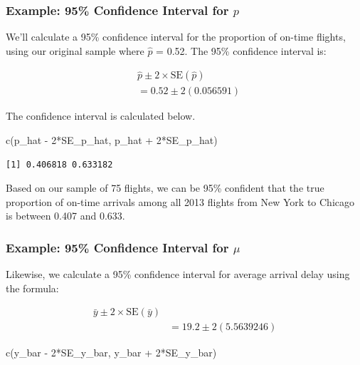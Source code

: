 \documentclass[
  letterpaper,
  DIV=11,
  numbers=noendperiod]{scrreprt}
\newenvironment{Shaded}{\begin{snugshade}}{\end{snugshade}}
\newcommand{\DecValTok}[1]{\textcolor[rgb]{0.68,0.00,0.00}{#1}}
\newcommand{\FunctionTok}[1]{\textcolor[rgb]{0.28,0.35,0.67}{#1}}
\newcommand{\NormalTok}[1]{\textcolor[rgb]{0.00,0.23,0.31}{#1}}
\newcommand{\SpecialCharTok}[1]{\textcolor[rgb]{0.37,0.37,0.37}{#1}}
\begin{document}
\subsubsection{\texorpdfstring{Example: 95\% Confidence Interval for
\(p\)}{Example: 95\% Confidence Interval for p}}\label{example-95-confidence-interval-for-p}

We'll calculate a 95\% confidence interval for the proportion of on-time
flights, using our original sample where \(\hat{p}\) = 0.52. The 95\%
confidence interval is:

\[
\begin{aligned}
& \hat{p} \pm 2\times \text{SE}(\hat{p}) \\
& = 0.52 \pm 2(0.056591)
\end{aligned}
\]

The confidence interval is calculated below.

\begin{Shaded}
\begin{Highlighting}[]
\FunctionTok{c}\NormalTok{(p\_hat }\SpecialCharTok{{-}} \DecValTok{2}\SpecialCharTok{*}\NormalTok{SE\_p\_hat, p\_hat }\SpecialCharTok{+} \DecValTok{2}\SpecialCharTok{*}\NormalTok{SE\_p\_hat) }
\end{Highlighting}
\end{Shaded}

\begin{verbatim}
[1] 0.406818 0.633182
\end{verbatim}

Based on our sample of 75 flights, we can be 95\% confident that the
true proportion of on-time arrivals among all 2013 flights from New York
to Chicago is between 0.407 and 0.633.

\subsubsection{\texorpdfstring{Example: 95\% Confidence Interval for
\(\mu\)}{Example: 95\% Confidence Interval for \textbackslash mu}}\label{example-95-confidence-interval-for-mu}

Likewise, we calculate a 95\% confidence interval for average arrival
delay using the formula:

\[
\begin{aligned}
\bar{y} \pm 2\times \text{SE}(\bar{y}) \\
& = 19.2 \pm 2(5.5639246)
\end{aligned}
\]

\begin{Shaded}
\begin{Highlighting}[]
\FunctionTok{c}\NormalTok{(y\_bar }\SpecialCharTok{{-}} \DecValTok{2}\SpecialCharTok{*}\NormalTok{SE\_y\_bar, y\_bar }\SpecialCharTok{+} \DecValTok{2}\SpecialCharTok{*}\NormalTok{SE\_y\_bar) }
\end{Highlighting}
\end{Shaded}
\end{document}
